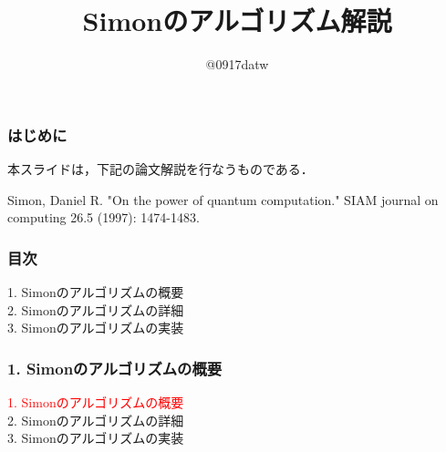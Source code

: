 \documentclass[dvipdfmx,12pt]{beamer}%
\title{Simonのアルゴリズム解説}
\author[Laplace0917]{@0917datw}
\date{}
\begin{document}
\maketitle


\begin{frame}

\frametitle{はじめに}

本スライドは，下記の論文解説を行なうものである．\\
  
\vspace{25pt}

\begin{center}
    Simon, Daniel R. 
    "On the power of quantum computation." 
    SIAM journal on computing 26.5 (1997): 1474-1483.
\end{center}

\end{frame}


\begin{frame}

\frametitle{目次}

1. Simonのアルゴリズムの概要 \\
2. Simonのアルゴリズムの詳細 \\
3. Simonのアルゴリズムの実装 \\
    
\end{frame}


\begin{frame}

\frametitle{1. Simonのアルゴリズムの概要}
  
\textcolor{red}{1. Simonのアルゴリズムの概要} \\
2. Simonのアルゴリズムの詳細 \\
3. Simonのアルゴリズムの実装 \\
      
\end{frame}
\end{document}
